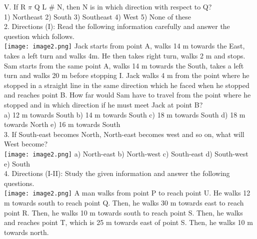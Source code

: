\documentclass[
]{article}
\begin{document}
V. If R $\pi$ Q L \# N, then N is in which direction with respect to Q?\\
1) Northeast \hspace{2mm}2) South \hspace{2mm}3) Southeast \hspace{2mm}4) West \hspace{2mm}5) None of these\\

2. Directions (I): Read the following information carefully and answer the question which follows.\\
\texttt{[image: image2.png]}
Jack starts from point A, walks 14 m towards the East, takes a left turn and walks 4m. He then takes right turn, walks 2 m and stops. Sam starts from the same point A, walks 14 m
towards the South, takes a left turn and walks 20 m before stopping I. Jack walks 4 m from the point where he stopped in a straight line in the same direction which he faced when he stopped and reaches point B. How far would Sam have to travel from the point where he stopped and in which direction if he must meet Jack at point B?\\
a) 12 m towards South \hspace{2mm}b) 14 m towards South
\hspace{2mm}c) 18 m towards South \hspace{2mm}d) 18 m towards North \hspace{2mm}e) 16 m towards South\\

3. If South-east becomes North, North-east becomes west and so on, what will West become?\\
\texttt{[image: image2.png]}
a) North-east \hspace{2mm}b) North-west \hspace{2mm}c) South-east \hspace{2mm}d) South-west \hspace{2mm}e) South\\

4. Directions (I-II): Study the given information and answer the following questions.\\
\texttt{[image: image2.png]}
A man walks from point P to reach point U. He walks 12 m towards south to reach point Q. Then, he walks 30 m towards east to reach point R. Then, he walks 10 m towards south to
reach point S. Then, he walks and reaches point T, which is 25 m towards east of point S. Then, he walks 10 m towards north.\\
\end{document}
